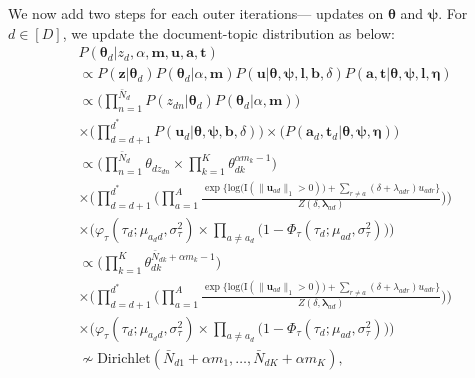 \documentclass{article}
\begin{document}
We now add two steps for each outer iterations--- updates on $\boldsymbol{\theta}$ and $\boldsymbol{\psi}$. For $d \in [D]$, we update the document-topic distribution as below:
\begin{equation}
\begin{aligned}
&P(\boldsymbol{\theta}_{d}|z_d, \alpha, \boldsymbol{m},  \boldsymbol{u},  \boldsymbol{a},  \boldsymbol{t}) \\&\propto P(\boldsymbol{z}|\boldsymbol{\theta}_d)P(\boldsymbol{\theta}_d|\alpha, \boldsymbol{m})P(\boldsymbol{u}|\boldsymbol{\theta},\boldsymbol{\psi},\boldsymbol{l}, \boldsymbol{b}, \delta)P(\boldsymbol{a}, \boldsymbol{t}|\boldsymbol{\theta},\boldsymbol{\psi}, \boldsymbol{l},\boldsymbol{\eta})
\\&\propto \Big(\prod_{n=1}^{\bar N_d} P(z_{dn}|\boldsymbol{\theta}_{d}) P(\boldsymbol{\theta}_{d}|\alpha, \boldsymbol{m})\Big)\\&\times \Big(\prod_{d=d+1}^{d^*}P(\boldsymbol{u}_d|\boldsymbol{\theta},\boldsymbol{\psi}, \boldsymbol{b}, \delta)\Big)\times \Big(P(\boldsymbol{a}_d, \boldsymbol{t}_d|\boldsymbol{\theta},\boldsymbol{\psi}, \boldsymbol{\eta})\Big)\\
&\propto\Big(\prod_{n=1}^{\bar N_d} \theta_{dz_{dn}}\times \prod_{k=1}^{K} \theta_{dk}^{\alpha m_k - 1}\Big)\\&\times\Big(\prod_{d=d+1}^{d^*}\Big(
\prod_{a=1}^A \frac{\exp\Big\{\mbox{log}\big(\text{I}( \lVert \boldsymbol{u}_{ad}\rVert_1 > 0)\big) + \sum\limits_{r \neq a} (\delta+\lambda_{adr})u_{adr}\Big\}}{Z(\delta,\boldsymbol{\lambda}_{ad})}\Big)\Big)
\\&\times\Big(\varphi_{\tau}(\tau_{d}; \mu_{a_d d}, \sigma_\tau^2)\times \prod_{a\neq a_d}\big(1-\Phi_{\tau}(\tau_{d}; \mu_{a d}, \sigma_\tau^2) \big)\Big)\\
&\propto\Big(\prod_{k=1}^{K} \theta_{dk}^{\bar N_{dk}+\alpha m_k - 1}\Big)\\&\times\Big(\prod_{d=d+1}^{d^*}\Big(
\prod_{a=1}^A \frac{\exp\Big\{\mbox{log}\big(\text{I}( \lVert \boldsymbol{u}_{ad}\rVert_1 > 0)\big) + \sum\limits_{r \neq a} (\delta+\lambda_{adr})u_{adr}\Big\}}{Z(\delta,\boldsymbol{\lambda}_{ad})}\Big)\Big)
\\&\times\Big(\varphi_{\tau}(\tau_{d}; \mu_{a_d d}, \sigma_\tau^2)\times \prod_{a\neq a_d}\big(1-\Phi_{\tau}(\tau_{d}; \mu_{a d}, \sigma_\tau^2) \big)\Big)\\
& \nsim \mbox{Dirichlet}(\bar N_{d1} + \alpha m_1,\ldots, \bar N_{dK} + \alpha m_K),
\end{aligned}
\end{equation}
\end{document}
